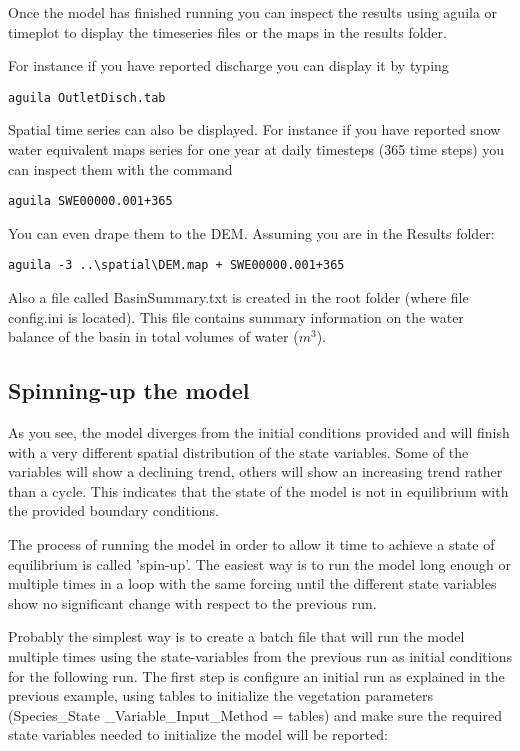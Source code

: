 Once the model has finished running you can inspect the results using \textsf{aguila} or \textsf{timeplot} to display the timeseries files or the maps in the results folder. 

For instance if you have reported discharge you can display it by typing

\begin{verbatim}
aguila OutletDisch.tab
\end{verbatim}

Spatial time series can also be displayed. For instance if you have reported snow water equivalent maps series for one year at daily timesteps (365 time steps) you can inspect them with the command

\begin{verbatim}
aguila SWE00000.001+365
\end{verbatim}

You can even drape them to the DEM. Assuming you are in the \textsf{Results} folder:

\begin{verbatim}
aguila -3 ..\spatial\DEM.map + SWE00000.001+365
\end{verbatim}

Also a file called \textsf{BasinSummary.txt} is created in the root folder (where file \textsf{config.ini} is located). This file contains summary information on the water balance of the basin in total volumes of water ($m^{3}$).
 

\subsection{Spinning-up the model}

As you see, the model diverges from the initial conditions provided and will finish with a very different spatial distribution of the state variables. Some of the variables will show a declining trend, others will show an increasing trend rather than a cycle. This indicates that the state of the model is not in equilibrium with the provided boundary conditions.

The process of running the model in order to allow it time to achieve a state of equilibrium is called 'spin-up'. The easiest way is to run the model long enough or multiple times in a loop with the same forcing until the different state variables show no significant change with respect to the previous run.


Probably the simplest way is to create a batch file that will run the model multiple times using the state-variables from the previous run as initial conditions for the following run. The first step is configure an initial run as explained in the previous example, using tables to initialize the vegetation parameters (\textsf{Species\_State \_Variable\_Input\_Method = tables}) and make sure the required state variables needed to initialize the model will be reported:
 
